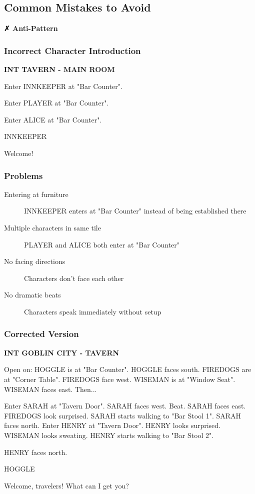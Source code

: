 \documentclass[11pt,letterpaper,oldstylefigures]{memoir}
\newcommand{\slugline}[1]{\nobreak\textbf{\MakeUppercase{#1}}\par\nobreak\vspace{1\baselineskip}}
\newcommand{\speaker}[1]{\nobreak\hspace*{0.333\textwidth}\MakeUppercase{#1}\par\nobreak\vspace{0.5\baselineskip}}
\newcommand{\dialogue}[1]{\nobreak\hspace*{0.25\textwidth}\begin{minipage}{0.5\textwidth}#1\end{minipage}\par\vspace{1\baselineskip}}
\newcommand{\stagedir}[1]{#1\par\vspace{1\baselineskip}}
\newenvironment{FountainExample}
  {\begingroup
  \ttfamily\small
   \setlength{\parindent}{0pt}
  \setlength{\parskip}{0.5em}
  \allowdisplaybreaks
  \setlength{\displaywidowpenalty}{0}
  \setlength{\widowpenalty}{0}
  \setlength{\clubpenalty}{0}
  \setlength{\interlinepenalty}{0}
}
  {\endgroup}
\newenvironment{AntiPattern}
{\begingroup
\small
\setlength{\parindent}{0pt}
\setlength{\parskip}{0.5em}
\allowdisplaybreaks
\setlength{\displaywidowpenalty}{0}
\setlength{\widowpenalty}{0}
\setlength{\clubpenalty}{0}
\setlength{\interlinepenalty}{0}
\begin{tcolorbox}[
    colback=red!5,
    colframe=red!75!black,
    boxrule=0.5pt,
    arc=2pt,
    left=0.5em,
    right=0.5em,
    top=0.25em,
    bottom=0.25em
]
\textbf{✗ Anti-Pattern}
\end{tcolorbox}\par
}
{\endgroup}
\begin{document}
\subsection{Common Mistakes to Avoid}

\begin{AntiPattern}
\subsubsection{Incorrect Character Introduction}
\begin{FountainExample}
\slugline{INT TAVERN - MAIN ROOM}

\stagedir{Enter INNKEEPER at "Bar Counter".}
\stagedir{Enter PLAYER at "Bar Counter".}
\stagedir{Enter ALICE at "Bar Counter".}

\speaker{INNKEEPER}
\dialogue{Welcome!}
\end{FountainExample}

\subsubsection{Problems}
\begin{description}
\item[Entering at furniture] INNKEEPER enters at "Bar Counter" instead of being established there
\item[Multiple characters in same tile] PLAYER and ALICE both enter at "Bar Counter"
\item[No facing directions] Characters don't face each other
\item[No dramatic beats] Characters speak immediately without setup
\end{description}
\end{AntiPattern}

\subsubsection{Corrected Version}
\begin{FountainExample}
\slugline{INT GOBLIN CITY - TAVERN}

\stagedir{Open on: HOGGLE is at "Bar Counter". HOGGLE faces south. FIREDOGS are at "Corner Table". FIREDOGS face west. WISEMAN is at "Window Seat". WISEMAN faces east. Then...}
\stagedir{Enter SARAH at "Tavern Door". SARAH faces west. Beat. SARAH faces east. FIREDOGS look surprised. SARAH starts walking to "Bar Stool 1". SARAH faces north. Enter HENRY at "Tavern Door". HENRY looks surprised. WISEMAN looks sweating. HENRY starts walking to "Bar Stool 2".}
\stagedir{HENRY faces north.}

\speaker{HOGGLE}
\dialogue{Welcome, travelers! What can I get you?}
\end{FountainExample}
\end{document}
